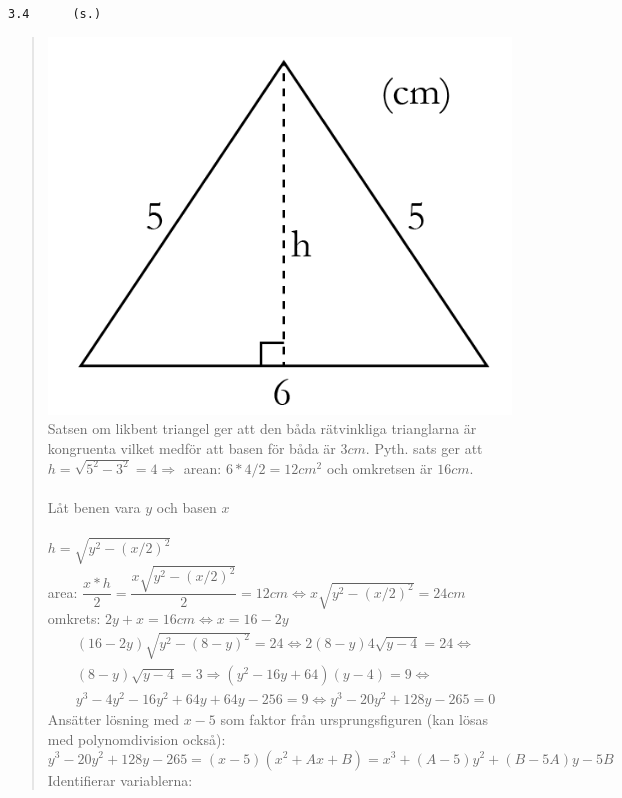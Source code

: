 \documentclass[a4paper]{article}
\newcommand{\tskcol}[1]{\textcolor{tskcol}{#1}}
\begin{document}
	\pagebreak	
	\texttt{\tskcol{3.4~~~~~ (s.)}}
	\begin{quotation}
		\noindent
		\includegraphics[scale=0.3]{images/34.png} \\
		Satsen om likbent triangel ger att den båda rätvinkliga trianglarna är kongruenta vilket medför att basen för båda är $3cm$.
		Pyth. sats ger att $h=\sqrt{5^2-3^2}=4 \Rightarrow$ arean: $6*4/2=12cm^2$ och omkretsen är $16cm$. \\ \\
		Låt benen vara $y$ och basen $x$ \\ \\
		$h=\sqrt{y^2-(x/2)^2}$ \\
		area: $\dfrac{x*h}{2}=\dfrac{x\sqrt{y^2-(x/2)^2}}{2}=12cm \Leftrightarrow x\sqrt{y^2-(x/2)^2}=24cm$ \\
		omkrets: $2y+x=16cm \Leftrightarrow x=16-2y$
		\begin{align*}
		&(16-2y)\sqrt{y^2-(8-y)^2}=24 \Leftrightarrow
		2(8-y)4\sqrt{y-4}=24 \Leftrightarrow \\
		&(8-y)\sqrt{y-4}=3 \Rightarrow
		(y^2-16y+64)(y-4)=9 \Leftrightarrow \\
		&y^3-4y^2-16y^2+64y+64y-256=9 \Leftrightarrow
		y^3-20y^2+128y-265=0
		\end{align*}
		Ansätter lösning med $x-5$ som faktor från ursprungsfiguren (kan lösas med polynomdivision också): \\
		\[y^3-20y^2+128y-265=(x-5)(x^2+Ax+B)=x^3+(A-5)y^2+(B-5A)y-5B\]
		Identifierar variablerna: \\

\end{quotation}
\end{document}
